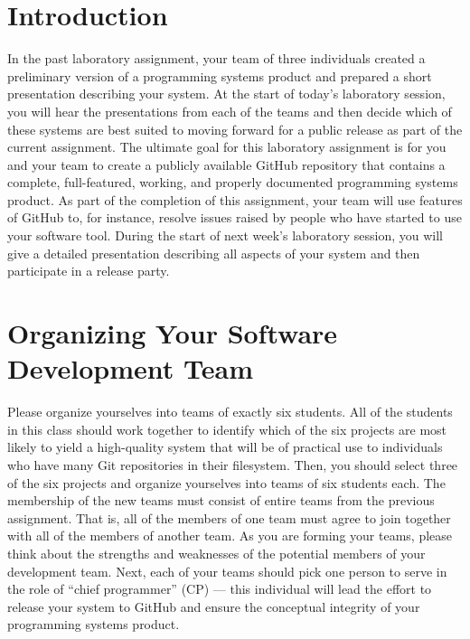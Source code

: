 

\usepackage[compact]{titlesec}



\vspace*{-.1in}
\section*{Introduction}

In the past laboratory assignment, your team of three individuals created a preliminary version of a programming systems
product and prepared a short presentation describing your system. At the start of today's laboratory session, you will
hear the presentations from each of the teams and then decide which of these systems are best suited to moving forward
for a public release as part of the current assignment. The ultimate goal for this laboratory assignment is for you and
your team to create a publicly available GitHub repository that contains a complete, full-featured, working, and
properly documented programming systems product. As part of the completion of this assignment, your team will use
features of GitHub to, for instance, resolve issues raised by people who have started to use your software tool. During
the start of next week's laboratory session, you will give a detailed presentation describing all aspects of your system
and then participate in a release party.

\section*{Organizing Your Software Development Team}

Please organize yourselves into teams of exactly six students. All of the students in this class should work together to
identify which of the six projects are most likely to yield a high-quality system that will be of practical use to
individuals who have many Git repositories in their filesystem. Then, you should select three of the six projects and
organize yourselves into teams of six students each.  The membership of the new teams must consist of entire teams from
the previous assignment. That is, all of the members of one team must agree to join together with all of the members of
another team.  As you are forming your teams, please think about the strengths and weaknesses of the potential members
of your development team. Next, each of your teams should pick one person to serve in the role of ``chief programmer''
(CP) --- this individual will lead the effort to release your system to GitHub and ensure the conceptual integrity of
your programming systems product.

